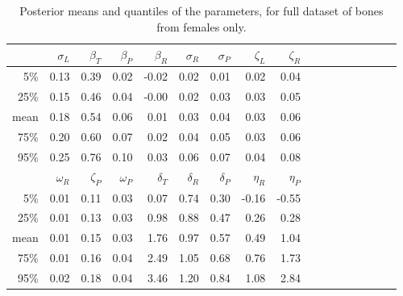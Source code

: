 \documentclass[12pt]{article}
\begin{document}
\begin{table}[ht]
    \footnotesize
\centering
\begin{tabular}{rrrrrrrrrrrrrrrrr}
  \hline
        &  $\sigma_L$  &  $\beta_T$  &  $\beta_P$  &  $\beta_R$  &  $\sigma_R$  &  $\sigma_P$  &  $\zeta_L$  &  $\zeta_R$   \\
\hline
5\%     &  0.13        &  0.39       &  0.02       &  -0.02      &  0.02        &  0.01        &  0.02       &  0.04        \\
25\%    &  0.15        &  0.46       &  0.04       &  -0.00      &  0.02        &  0.03        &  0.03       &  0.05        \\
mean    &  0.18        &  0.54       &  0.06       &  0.01       &  0.03        &  0.04        &  0.03       &  0.06        \\
75\%    &  0.20        &  0.60       &  0.07       &  0.02       &  0.04        &  0.05        &  0.03       &  0.06        \\
95\%    &  0.25        &  0.76       &  0.10       &  0.03       &  0.06        &  0.07        &  0.04       &  0.08        \\
   \hline
  \hline
        &  $\omega_R$  &  $\zeta_P$  &  $\omega_P$  &  $\delta_T$  &  $\delta_R$  &  $\delta_P$  &  $\eta_R$  &  $\eta_P$  \\
\hline
5\%     &  0.01        &  0.11       &  0.03        &  0.07        &  0.74        &  0.30        &  -0.16     &  -0.55     \\
25\%    &  0.01        &  0.13       &  0.03        &  0.98        &  0.88        &  0.47        &  0.26      &  0.28      \\
mean    &  0.01        &  0.15       &  0.03        &  1.76        &  0.97        &  0.57        &  0.49      &  1.04      \\
75\%    &  0.01        &  0.16       &  0.04        &  2.49        &  1.05        &  0.68        &  0.76      &  1.73      \\
95\%    &  0.02        &  0.18       &  0.04        &  3.46        &  1.20        &  0.84        &  1.08      &  2.84      \\
   \hline
\end{tabular}
\caption{ \label{tab:females_posterior_distrns} Posterior means and quantiles of the parameters, for full dataset of bones from females only.  
}
\end{table}
\end{document}
